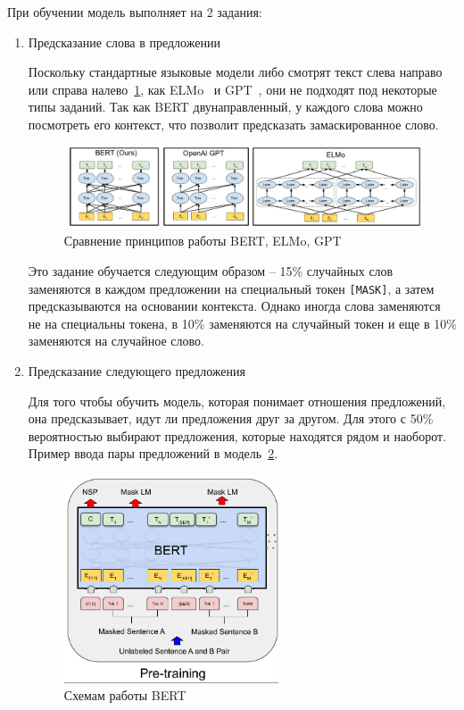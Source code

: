 \documentclass{article}
\begin{document}
При обучении модель выполняет на 2 задания:
\begin{enumerate}
\item Предсказание слова в предложении

Поскольку стандартные языковые модели либо смотрят текст слева направо или справа налево~\ref{fig:BERT_comparisons}, как ELMo~\autocite{peters_deep_2018} и GPT~\autocite{radford_language_2019}, они не подходят под некоторые типы заданий. Так как BERT двунаправленный, у каждого слова можно посмотреть его контекст, что позволит предсказать замаскированное слово.

\begin{figure}[h]
\centering
\includegraphics[width=.9\linewidth]{img/BERT_comparisons.pdf}
\caption{\label{fig:BERT_comparisons}Сравнение принципов работы BERT, ELMo, GPT}
\end{figure}

Это задание обучается следующим образом -- 15\% случайных слов заменяются в каждом предложении на специальный токен \texttt{[MASK]}, а затем предсказываются на основании контекста. Однако иногда слова заменяются не на специальны токена, в 10\% заменяются на случайный токен и еще в 10\% заменяются на случайное слово.

\item Предсказание следующего предложения

Для того чтобы обучить модель, которая понимает отношения предложений, она предсказывает, идут ли предложения друг за другом. Для этого с 50\% вероятностью выбирают предложения, которые находятся рядом и наоборот. Пример ввода пары предложений в модель~\ref{fig:bert_pretrainin}.

\begin{figure}[hbp]
\centering
\includegraphics[width=0.6\textwidth]{img/bert_pretrainin.png}
\caption{\label{fig:bert_pretrainin}Схемам работы BERT}
\end{figure}
\end{enumerate}
\end{document}
